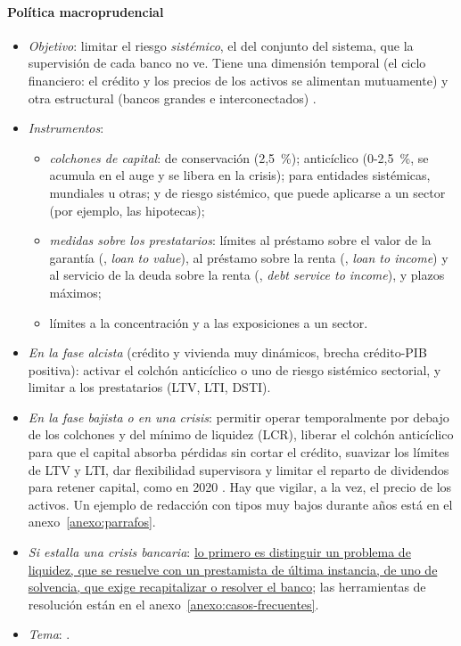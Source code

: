 \documentclass[11pt]{article}
\begin{document}
\paragraph{Política macroprudencial}
\begin{itemize}
\item \emph{Objetivo}: limitar el riesgo \emph{sistémico}, el del conjunto del sistema, que la supervisión de cada banco no ve. Tiene una dimensión temporal (el ciclo financiero: el crédito y los precios de los activos se alimentan mutuamente) y otra estructural (bancos grandes e interconectados) \parencite{CERS2014Manual}.
\item \emph{Instrumentos}:
  \begin{itemize}
  \item \emph{colchones de capital}: de conservación (2,5~\%); anticíclico (0-2,5~\%, se acumula en el auge y se libera en la crisis); para entidades sistémicas, mundiales u otras; y de riesgo sistémico, que puede aplicarse a un sector (por ejemplo, las hipotecas);
  \item \emph{medidas sobre los prestatarios}: límites al préstamo sobre el valor de la garantía (, \emph{loan to value}), al préstamo sobre la renta (, \emph{loan to income}) y al servicio de la deuda sobre la renta (, \emph{debt service to income}), y plazos máximos;
  \item límites a la concentración y a las exposiciones a un sector.
  \end{itemize}
\item \emph{En la fase alcista} (crédito y vivienda muy dinámicos, brecha crédito-PIB positiva): activar el colchón anticíclico o uno de riesgo sistémico sectorial, y limitar a los prestatarios (LTV, LTI, DSTI).
\item \emph{En la fase bajista o en una crisis}: permitir operar temporalmente por debajo de los colchones y del mínimo de liquidez (LCR), liberar el colchón anticíclico para que el capital absorba pérdidas sin cortar el crédito, suavizar los límites de LTV y LTI, dar flexibilidad supervisora y limitar el reparto de dividendos para retener capital, como en 2020 \parencite{BCE2020Dividendos}. Hay que vigilar, a la vez, el precio de los activos. Un ejemplo de redacción con tipos muy bajos durante años está en el anexo~\ref{anexo:parrafos}.
\item \emph{Si estalla una crisis bancaria}: \uline{lo primero es distinguir un problema de liquidez, que se resuelve con un prestamista de última instancia, de uno de solvencia, que exige recapitalizar o resolver el banco}; las herramientas de resolución están en el anexo~\ref{anexo:casos-frecuentes}.
\item \emph{Tema}:   .
\end{itemize}
\end{document}
